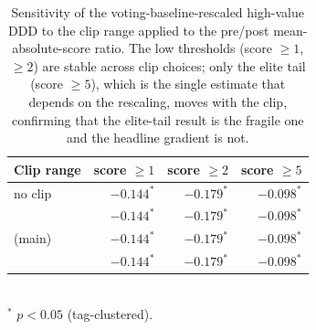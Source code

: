 \begin{table}[ht]
\centering
\caption{Sensitivity of the voting-baseline-rescaled high-value DDD to the clip range applied to the pre/post mean-absolute-score ratio. The low thresholds (score $\geq 1$, $\geq 2$) are stable across clip choices; only the elite tail (score $\geq 5$), which is the single estimate that depends on the rescaling, moves with the clip, confirming that the elite-tail result is the fragile one and the headline gradient is not.}
\label{tab:clip_sensitivity}
\small
\begin{tabular}{lrrr}
\toprule
Clip range & score $\geq 1$ & score $\geq 2$ & score $\geq 5$ \\
\midrule
no clip & $-0.144^{*}$ & $-0.179^{*}$ & $-0.098^{*}$ \\
[0.3, 5.0] & $-0.144^{*}$ & $-0.179^{*}$ & $-0.098^{*}$ \\
[0.5, 3.0] (main) & $-0.144^{*}$ & $-0.179^{*}$ & $-0.098^{*}$ \\
[0.7, 2.0] & $-0.144^{*}$ & $-0.179^{*}$ & $-0.098^{*}$ \\
\bottomrule
\end{tabular}
\\[2pt]\footnotesize $^{*}$ $p<0.05$ (tag-clustered).
\end{table}